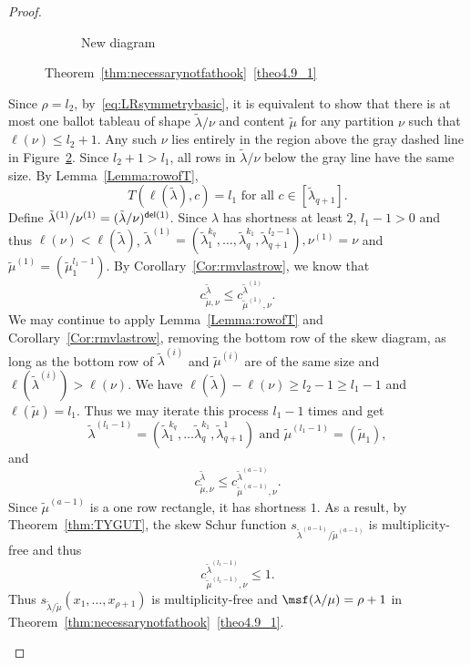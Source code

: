 \begin{proof}
\begin{Case}
\begin{figure}[htb]
\begin{subfigure}{0.47\textwidth}
 \caption{New diagram}
 \label{case1anew}
 \end{subfigure}
 
 \caption{Theorem~\ref{thm:necessarynotfathook}~\ref{theo4.9_1}}
 
\end{figure}

Since $\rho = l_2$, by~\eqref{eq:LRsymmetrybasic}, it is equivalent to show that there is at most one ballot tableau of shape $\tilde\lambda/\nu$ and content $\tilde\mu$ for any partition $\nu$ such that $\ell(\nu)\leq l_2+1$. Any such $\nu$ lies entirely in the region above the gray dashed line in Figure~\ref{case1anew}. Since $l_2+1 > l_1$, all rows in $\tilde\lambda/\nu$ below the gray line have the same size. By Lemma~\ref{Lemma:rowofT}, 
\[
T(\ell(\tilde\lambda),c) = l_1 \text{ for all }c\in[\tilde\lambda_{q+1}].
\]
Define $\tilde\lambda^{(1)}/\nu^{(1)} = (\tilde\lambda/\nu)^{{\sf{del}}(1)}$. Since $\lambda$ has shortness at least $2$, $l_1-1>0$ and thus $\ell(\nu)<\ell(\tilde\lambda)$,
$\tilde\lambda^{(1)} = (\tilde\lambda_1^{k_q}, \ldots,\tilde\lambda_q^{k_1}, \tilde\lambda_{q+1}^{l_2-1}), \nu^{(1)} = \nu$ and $\tilde\mu^{(1)} = (\tilde\mu_1^{l_1-1})$.
By Corollary~\ref{Cor:rmvlastrow}, we know that
\[
c^{\tilde\lambda}_{\tilde\mu,\nu}\leq c^{\tilde\lambda^{(1)}}_{\tilde\mu^{(1)},\nu}.
\]
We may continue to apply Lemma~\ref{Lemma:rowofT} and Corollary~\ref{Cor:rmvlastrow}, removing the bottom row of the skew diagram, as long as the bottom row of $\tilde\lambda^{(i)}$ and $\tilde\mu^{(i)}$ are of the same size and $\ell(\tilde\lambda^{(i)})>\ell(\nu)$. We have $\ell(\tilde\lambda) - \ell(\nu)\geq l_2-1 \geq l_1-1$ and $\ell(\tilde\mu) = l_1$. Thus we may iterate this process $l_1-1$ times and get
\[
\tilde\lambda^{(l_1-1)} = (\tilde\lambda_1^{k_q}, \ldots\tilde\lambda_q^{k_1}, \tilde\lambda_{q+1}^{1})\text{ and }\tilde\mu^{(l_1-1)} = (\tilde\mu_1),
\]
and
\[
c^{\tilde\lambda}_{\tilde\mu, \nu}\leq c^{\tilde\lambda^{(a-1)}}_{\tilde\mu^{(a-1)}, \nu}.
\]
Since $\tilde\mu^{(a-1)}$ is a one row rectangle, it has shortness $1$. As a result, by Theorem~\ref{thm:TYGUT}, the skew Schur function $s_{\tilde\lambda^{(a-1)}/\tilde\mu^{(a-1)}}$ is multiplicity-free and thus 
\[
c^{\tilde\lambda^{(l_1-1)}}_{\tilde\mu^{(l_1-1)}, \nu}\leq 1.
\]
Thus $s_{\tilde\lambda/\tilde\mu}(x_1,\ldots,x_{\rho+1})$ is multiplicity-free and ${\msf }(\lambda/\mu) = \rho+1$ in Theorem~\ref{thm:necessarynotfathook}~\ref{theo4.9_1}.
\end{Case}


\end{proof}

